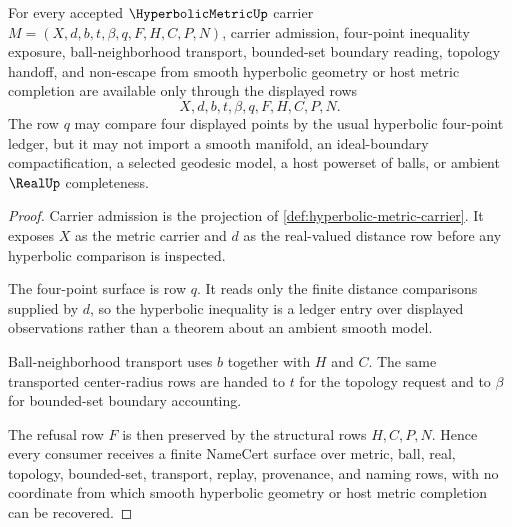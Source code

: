 \begin{theorem}
\label{thm:hyperbolic-metric-four-point-obligation-surface}
For every accepted $\HyperbolicMetricUp$ carrier $M=(X,d,b,t,\beta,q,F,H,C,P,N)$, carrier admission, four-point inequality exposure, ball-neighborhood transport, bounded-set boundary reading, topology handoff, and non-escape from smooth hyperbolic geometry or host metric completion are available only through the displayed rows
$$
X,d,b,t,\beta,q,F,H,C,P,N.
$$
The row $q$ may compare four displayed points by the usual hyperbolic four-point ledger, but it may not import a smooth manifold, an ideal-boundary compactification, a selected geodesic model, a host powerset of balls, or ambient $\RealUp$ completeness.
\end{theorem}
\begin{proof}
Carrier admission is the projection of \autoref{def:hyperbolic-metric-carrier}. It exposes $X$ as the metric carrier and $d$ as the real-valued distance row before any hyperbolic comparison is inspected.

The four-point surface is row $q$. It reads only the finite distance comparisons supplied by $d$, so the hyperbolic inequality is a ledger entry over displayed observations rather than a theorem about an ambient smooth model.

Ball-neighborhood transport uses $b$ together with $H$ and $C$. The same transported center-radius rows are handed to $t$ for the topology request and to $\beta$ for bounded-set boundary accounting.

The refusal row $F$ is then preserved by the structural rows $H,C,P,N$. Hence every consumer receives a finite NameCert surface over metric, ball, real, topology, bounded-set, transport, replay, provenance, and naming rows, with no coordinate from which smooth hyperbolic geometry or host metric completion can be recovered.
\end{proof}



